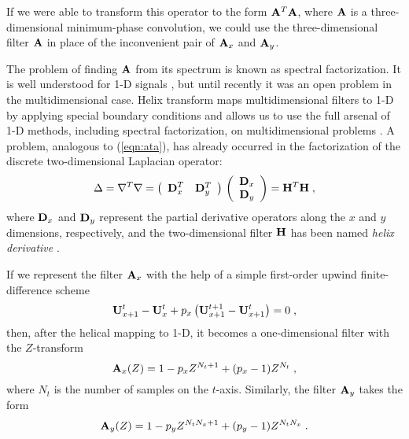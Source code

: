 If we were able to transform this operator to the form
$\bold{A}^T \bold{A}$, where $\bold{A}$ is a three-dimensional
minimum-phase convolution, we could use the three-dimensional filter
$\bold{A}$ in place of the inconvenient pair of $\bold{A}_x$ and
$\bold{A}_y$.
\par
The problem of finding $\bold{A}$ from its spectrum is known as
spectral factorization. It is well understood for 1-D signals
\cite{Claerbout.fgdp.76}, but until recently it was an open problem in
the multidimensional case. Helix transform maps multidimensional
filters to 1-D by applying special boundary conditions and allows us
to use the full arsenal of 1-D methods, including spectral
factorization, on multidimensional problems \cite{helix}. A problem,
analogous to (\ref{eqn:ata}), has already occurred in the factorization
of the discrete two-dimensional Laplacian operator:
\begin{equation}
\label{eqn:lap}
\Delta = \nabla^T \nabla = 
\left(\begin{array}{cc}\displaystyle \bold{D}_x^T & \bold{D}_y^T
      \end{array}\right)\,
\left(\begin{array}{c}\displaystyle
\bold{D}_x \\
\bold{D}_y
\end{array}\right) = \bold{H}^T \bold{H}\;,
\end{equation}
where $\bold{D}_x$ and $\bold{D}_y$ represent the partial derivative
operators along the $x$ and $y$ dimensions, respectively, and the
two-dimensional filter $\bold{H}$ has been named \emph{helix
  derivative} \cite{gee,Zhao.sep.100.yi1}.
\par
If we represent the filter $\bold{A}_x$ with the help of a simple first-order 
upwind finite-difference scheme 
\begin{equation}
\label{eqn:fin}
\bold{U}_{x+1}^t - \bold{U}_{x}^t + p_x \left(\bold{U}_{x+1}^{t+1} - \bold{U}_{x+1}^{t}\right) = 0\;,
\end{equation}
then, after the helical mapping to 1-D, it becomes a one-dimensional
filter with the $Z$-transform
\begin{equation}
\label{eqn:hlx}
\bold{A}_x (Z) = 1 - p_x Z^{N_t + 1} + (p_x - 1) Z^{N_t}\;,
\end{equation}
where $N_t$ is the number of samples on the $t$-axis. Similarly, the
filter $\bold{A}_y$ takes the form
\begin{equation}
\label{eqn:hly}
\bold{A}_y (Z) = 1 - p_y Z^{N_t N_x + 1} + (p_y - 1) Z^{N_t N_x}\;.
\end{equation}
